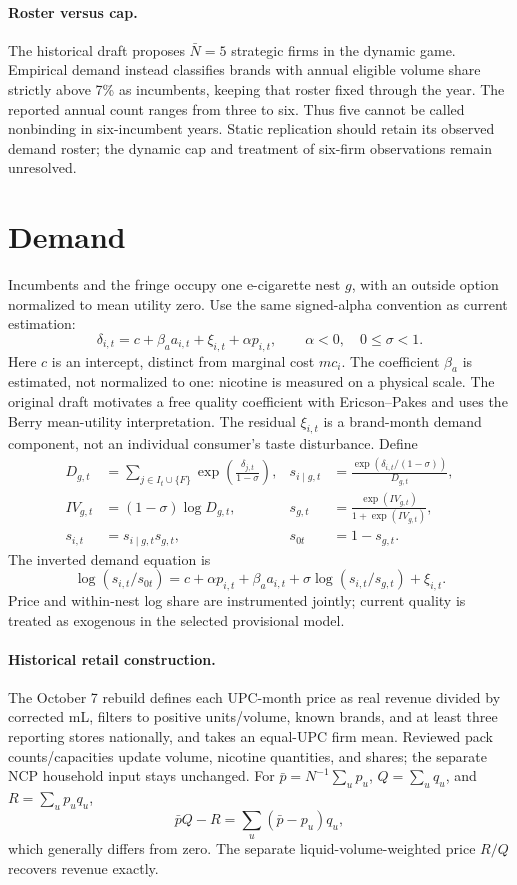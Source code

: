\documentclass[11pt]{article}
\begin{document}
\paragraph{Roster versus cap.} The historical draft proposes $\bar N=5$ strategic firms in the dynamic game. Empirical demand instead classifies brands with annual eligible volume share strictly above 7\% as incumbents, keeping that roster fixed through the year. The reported annual count ranges from three to six. Thus five cannot be called nonbinding in six-incumbent years. Static replication should retain its observed demand roster; the dynamic cap and treatment of six-firm observations remain unresolved.

\section{Demand}\label{sec:demand}
Incumbents and the fringe occupy one e-cigarette nest $g$, with an outside option normalized to mean utility zero. Use the same signed-alpha convention as current estimation:
\begin{equation}
\delta_{i,t}=c+\beta_a a_{i,t}+\xi_{i,t}+\alpha p_{i,t},\qquad \alpha<0,\quad 0\leq\sigma<1.
\end{equation}
Here $c$ is an intercept, distinct from marginal cost $mc_i$. The coefficient $\beta_a$ is estimated, not normalized to one: nicotine is measured on a physical scale. The original draft motivates a free quality coefficient with Ericson--Pakes and uses the Berry mean-utility interpretation. The residual $\xi_{i,t}$ is a brand-month demand component, not an individual consumer's taste disturbance.
Define
\begin{align}
D_{g,t}&=\sum_{j\in I_t\cup\{F\}}\exp\!\left(\frac{\delta_{j,t}}{1-\sigma}\right),&
s_{i\mid g,t}&=\frac{\exp(\delta_{i,t}/(1-\sigma))}{D_{g,t}},\\
IV_{g,t}&=(1-\sigma)\log D_{g,t},&s_{g,t}&=\frac{\exp(IV_{g,t})}{1+\exp(IV_{g,t})},\\
s_{i,t}&=s_{i\mid g,t}s_{g,t},&s_{0t}&=1-s_{g,t}.
\end{align}
The inverted demand equation is
\begin{equation}\label{eq:inversion}
\log(s_{i,t}/s_{0t})=c+\alpha p_{i,t}+\beta_a a_{i,t}+\sigma\log(s_{i,t}/s_{g,t})+\xi_{i,t}.
\end{equation}
Price and within-nest log share are instrumented jointly; current quality is treated as exogenous in the selected provisional model.
\paragraph{Historical retail construction.} The October 7 rebuild defines each UPC-month price as real revenue divided by corrected mL, filters to positive units/volume, known brands, and at least three reporting stores nationally, and takes an equal-UPC firm mean. Reviewed pack counts/capacities update volume, nicotine quantities, and shares; the separate NCP household input stays unchanged. For $\bar p=N^{-1}\sum_u p_u$, $Q=\sum_u q_u$, and $R=\sum_u p_uq_u$,
\[
\bar pQ-R=\sum_u(\bar p-p_u)q_u,
\]
which generally differs from zero. The separate liquid-volume-weighted price $R/Q$ recovers revenue exactly.
\end{document}
